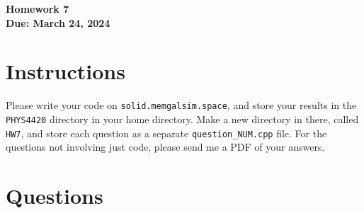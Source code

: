 \documentclass[11pt]{article}
\begin{document}
\begin{center}
\textbf{\Large Homework 7}\\
\textbf{Due: March 24, 2024}\\
\end{center}
\section*{Instructions}
Please write your code on \texttt{solid.memgalsim.space}, and store your results
in the \texttt{PHYS4420} directory in your home directory.  Make a new directory
in there, called \texttt{HW7}, and store each question as a separate
\texttt{question\_NUM.cpp} file.  For the questions not involving just code,
please send me a PDF of your answers.
\section*{Questions}
\end{document}
